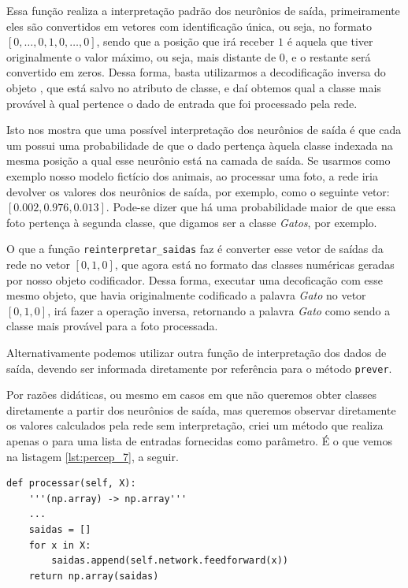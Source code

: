 Essa função realiza a interpretação padrão dos neurônios de saída, primeiramente eles são convertidos em vetores com identificação única, ou seja, no formato $[0, \ldots,0, 1, 0, \ldots, 0]$, sendo que a posição que irá receber $1$ é aquela que tiver originalmente o valor máximo, ou seja, mais distante de $0$, e o restante será convertido em zeros. Dessa forma, basta utilizarmos a decodificação inversa do objeto , que está salvo no atributo de classe, e daí obtemos qual a classe mais provável à qual pertence o dado de entrada que foi processado pela rede.

Isto nos mostra que uma possível interpretação dos neurônios de saída é que cada um possui uma probabilidade de que o dado pertença àquela classe indexada na mesma posição a qual esse neurônio está na camada de saída. Se usarmos como exemplo nosso modelo fictício dos animais, ao processar uma foto, a rede iria devolver os valores dos neurônios de saída, por exemplo, como o seguinte vetor: $[0.002, 0.976, 0.013]$. Pode-se dizer que há uma probabilidade maior de que essa foto pertença à segunda classe, que digamos ser a classe \emph{Gatos}, por exemplo.

O que a função \texttt{reinterpretar\_saidas} faz é converter esse vetor de saídas da rede no vetor $[0, 1, 0]$, que agora está no formato das classes numéricas geradas por nosso objeto codificador. Dessa forma, executar uma decoficação com esse mesmo objeto, que havia originalmente codificado a palavra \emph{Gato} no vetor $[0, 1, 0]$, irá fazer a operação inversa, retornando a palavra \emph{Gato} como sendo a classe mais provável para a foto processada.

Alternativamente podemos utilizar outra função de interpretação dos dados de saída, devendo ser informada diretamente por referência para o método \texttt{prever}.

Por razões didáticas, ou mesmo em casos em que não queremos obter classes diretamente a partir dos neurônios de saída, mas queremos observar diretamente os valores calculados pela rede sem interpretação, criei um método que realiza apenas o  para uma lista de entradas fornecidas como parâmetro. É o que vemos na listagem \ref{lst:percep_7}, a seguir.

\begin{scriptsize}
\estiloR
\begin{lstlisting}[caption={Trecho da classe \eng{Perceptron}}, label={lst:percep_7}, escapeinside={\%}]
def processar(self, X):
    '''(np.array) -> np.array'''
    ...
    saidas = []
    for x in X:
        saidas.append(self.network.feedforward(x))
    return np.array(saidas)
\end{lstlisting}
\end{scriptsize}


